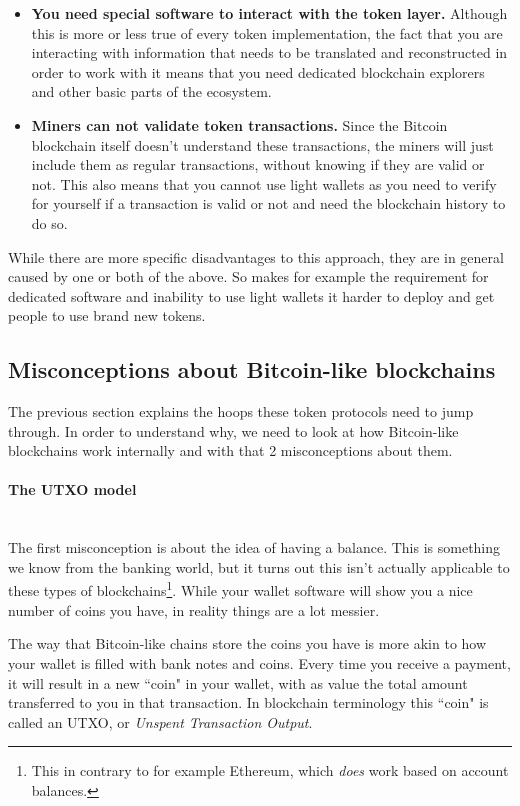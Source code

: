 \documentclass{article}
\begin{document}
\begin{itemize}
    \item \textbf{You need special software to interact with the token layer.} Although this is more or less true of every token implementation, the fact that you are interacting with information that needs to be translated and reconstructed in order to work with it means that you need dedicated blockchain explorers and other basic parts of the ecosystem.
    \item \textbf{Miners can not validate token transactions.} Since the Bitcoin blockchain itself doesn't understand these transactions, the miners will just include them as regular transactions, without knowing if they are valid or not. This also means that you cannot use light wallets as you need to verify for yourself if a transaction is valid or not and need the blockchain history to do so.
\end{itemize}

While there are more specific disadvantages to this approach, they are in general caused by one or both of the above. So makes for example the requirement for dedicated software and inability to use light wallets it harder to deploy and get people to use brand new tokens.

\subsection{Misconceptions about Bitcoin-like blockchains}

The previous section explains the hoops these token protocols need to jump through. In order to understand why, we need to look at how Bitcoin-like blockchains work internally and with that 2 misconceptions about them.


\paragraph{The UTXO model}\mbox{}\\
The first misconception is about the idea of having a balance. This is something we know from the banking world, but it turns out this isn't actually applicable to these types of blockchains\footnote{This in contrary to for example Ethereum, which \emph{does} work based on account balances.}. While your wallet software will show you a nice number of coins you have, in reality things are a lot messier.

The way that Bitcoin-like chains store the coins you have is more akin to how your wallet is filled with bank notes and coins. Every time you receive a payment, it will result in a new ``coin" in your wallet, with as value the total amount transferred to you in that transaction. In blockchain terminology this ``coin" is called an UTXO, or \emph{Unspent Transaction Output}.
\end{document}
